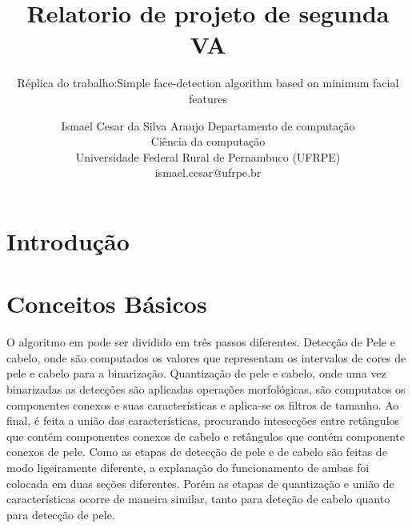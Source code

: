 \documentclass[journal,onecolumn]{IEEEtran}
\title{Relatorio de projeto de segunda VA}
\subtitle{Réplica do trabalho:Simple face-detection algorithm based on minimum facial features}
\author{		Ismael Cesar da Silva Araujo
  				Departamento de computação \\
				  Ciência da computação\\
		Universidade Federal Rural de Pernambuco (UFRPE)\\
			ismael.cesar@ufrpe.br}
\date{}
\begin{document}
\maketitle

\section{Introdução}

\section{Conceitos Básicos}
	\label{sec:conceitosBasicos}
	O algoritmo em \cite{chen2007simple} pode ser dividido em três passos diferentes. 
	Detecção de Pele e cabelo, onde são computados os valores que representam os intervalos de cores de pele e cabelo para a binarização. 
	Quantização de pele e cabelo, onde uma vez binarizadas as detecções são aplicadas operações morfológicas, são computatos os componentes conexos e suas características e aplica-se os filtros de tamanho.
	Ao final, é feita a união das características, procurando intesecções entre retângulos que contém componentes conexos de cabelo e retângulos que contém componente conexos de pele.
	Como as etapas de detecção de pele e de cabelo são feitas de modo ligeiramente diferente, a explanação do funcionamento de ambas foi colocada em duas seções diferentes.
	Porém as etapas de quantização e união de características ocorre de maneira similar, tanto para deteção de cabelo quanto para detecção de pele.
	
\end{document}
